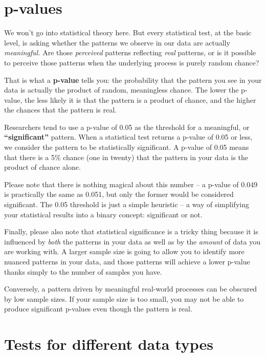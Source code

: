 \documentclass[
]{book}
\begin{document}
\hypertarget{p-values}{%
\section*{p-values}\label{p-values}}

We won't go into statistical theory here. But every statistical test, at the basic level, is asking whether the patterns we observe in our data are actually \emph{meaningful.} Are those \emph{perceived} patterns reflecting \emph{real} patterns, or is it possible to perceive those patterns when the underlying process is purely random chance?

That is what a \textbf{p-value} tells you: the probability that the pattern you see in your data is actually the product of random, meaningless chance. The lower the p-value, the less likely it is that the pattern is a product of chance, and the higher the chances that the pattern is real.

Researchers tend to use a p-value of 0.05 as the threshold for a meaningful, or \textbf{``significant''} pattern. When a statistical test returns a p-value of 0.05 or less, we consider the pattern to be statistically significant. A p-value of 0.05 means that there is a 5\% chance (one in twenty) that the pattern in your data is the product of chance alone.

Please note that there is nothing magical about this number -- a p-value of 0.049 is practically the same as 0.051, but only the former would be considered significant. The 0.05 threshold is just a simple heuristic -- a way of simplifying your statistical results into a binary concept: significant or not.

Finally, please also note that statistical significance is a tricky thing because it is influenced by \emph{both} the patterns in your data as well as by the \emph{amount} of data you are working with. A larger sample size is going to allow you to identify more nuanced patterns in your data, and those patterns will achieve a lower p-value thanks simply to the number of samples you have.

Conversely, a pattern driven by meaningful real-world processes can be obscured by low sample sizes. If your sample size is too small, you may not be able to produce significant p-values even though the pattern is real.

\hypertarget{tests-for-different-data-types}{%
\section*{Tests for different data types}\label{tests-for-different-data-types}}
\end{document}
